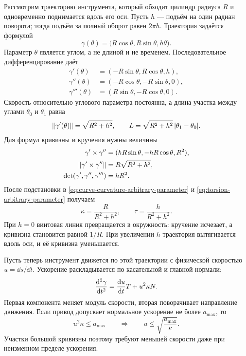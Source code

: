 Рассмотрим траекторию инструмента, который обходит цилиндр радиуса \(R\) и одновременно поднимается вдоль его оси. Пусть \(h\) --- подъём на один радиан поворота; тогда подъём за полный оборот равен \(2\pi h\). Траектория задаётся формулой
\begin{equation}
\label{eq:helix}
\gamma(\theta)
=\bigl(R\cos\theta,R\sin\theta,h\theta\bigr).
\end{equation}
Параметр \(\theta\) является углом, а не длиной и не временем. Последовательное дифференцирование даёт
\[
\begin{aligned}
\gamma'(\theta)&=(-R\sin\theta,R\cos\theta,h),\\
\gamma''(\theta)&=(-R\cos\theta,-R\sin\theta,0),\\
\gamma'''(\theta)&=(R\sin\theta,-R\cos\theta,0).
\end{aligned}
\]
Скорость относительно углового параметра постоянна, а длина участка между углами \(\theta_0\) и \(\theta_1\) равна
\[
\lVert\gamma'(\theta)\rVert=\sqrt{R^2+h^2},
\qquad
L=\sqrt{R^2+h^2}\,\lvert\theta_1-\theta_0\rvert.
\]
Для формул кривизны и кручения нужны величины
\[
\begin{aligned}
\gamma'\times\gamma''
&=(hR\sin\theta,-hR\cos\theta,R^2),\\
\lVert\gamma'\times\gamma''\rVert
&=R\sqrt{R^2+h^2},\\
\det(\gamma',\gamma'',\gamma''')&=hR^2.
\end{aligned}
\]
После подстановки в \eqref{eq:curve-curvature-arbitrary-parameter} и \eqref{eq:torsion-arbitrary-parameter} получаем
\begin{equation}
\label{eq:helix-curvature-torsion}
\boxed{
\kappa=\frac{R}{R^2+h^2},
\qquad
\tau=\frac{h}{R^2+h^2}
}.
\end{equation}
При \(h=0\) винтовая линия превращается в окружность: кручение исчезает, а кривизна становится равной \(1/R\). При увеличении \(h\) траектория вытягивается вдоль оси, и её кривизна уменьшается.

Пусть теперь инструмент движется по этой траектории с физической скоростью \(u=\dd s/\dd t\). Ускорение раскладывается по касательной и главной нормали:
\begin{equation}
\label{eq:curve-acceleration-decomposition}
\frac{\mathop{}\!\mathrm{d}^2\gamma}{\mathop{}\!\mathrm{d} t^2}
=\frac{\mathop{}\!\mathrm{d} u}{\mathop{}\!\mathrm{d} t}T+u^2\kappa N.
\end{equation}
Первая компонента меняет модуль скорости, вторая поворачивает направление движения. Если привод допускает нормальное ускорение не более \(a_{\max}\), то
\begin{equation}
\label{eq:curvature-speed-limit}
u^2\kappa\leq a_{\max}
\qquad\Longrightarrow\qquad
u\leq\sqrt{\frac{a_{\max}}{\kappa}}.
\end{equation}
Участки большой кривизны поэтому требуют меньшей скорости даже при неизменном пределе ускорения.

